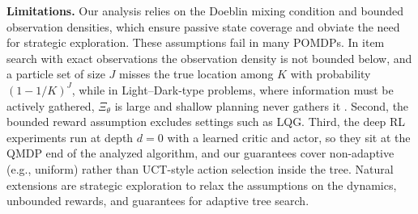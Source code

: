 \textbf{Limitations.} Our analysis relies on the Doeblin mixing condition and bounded observation densities, which ensure passive state coverage and obviate the need for strategic exploration.
These assumptions fail in many POMDPs.
In item search with exact observations the observation density is not bounded below, and a particle set of size $J$ misses the true location among $K$ with probability $(1-1/K)^J$, while in Light--Dark-type problems, where information must be actively gathered, $\Xi_\theta$ is large and shallow planning never gathers it .
Second, the bounded reward assumption excludes settings such as LQG.
Third, the deep RL experiments run at depth $d=0$ with a learned critic and actor, so they sit at the QMDP end of the analyzed algorithm, and our guarantees cover non-adaptive (e.g., uniform) rather than UCT-style action selection inside the tree.
Natural extensions are strategic exploration to relax the assumptions on the dynamics, unbounded rewards, and guarantees for adaptive tree search.